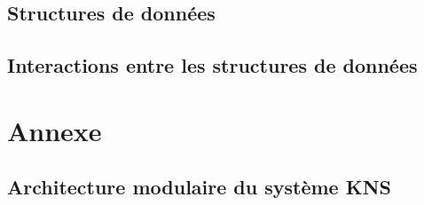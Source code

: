 \documentclass[10pt,a4paper]{report}
\begin{document}
	\subsection{Structures de données}

	\subsection{Interactions entre les structures de données} %

\newpage
\section{Annexe}

\subsection{Architecture modulaire du système KNS}
	\begin{center}
	\end{center}
\end{document}
